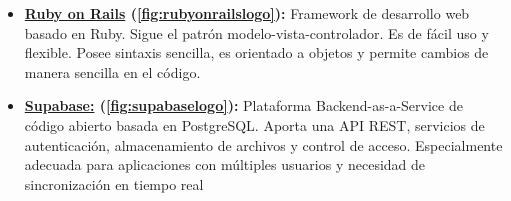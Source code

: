 \begin{itemize}
    \item \textbf{\href{https://rubyonrails.org/}{Ruby on Rails} \cite{rubyonrails2026home} (\ref{fig:rubyonrailslogo}):} Framework de desarrollo web basado en Ruby. Sigue el patrón modelo-vista-controlador. Es de fácil uso y flexible. Posee sintaxis sencilla, es orientado a objetos y permite cambios de manera sencilla en el código.

    \item \textbf{\href{https://supabase.com/}{Supabase:} \cite{supabase2026home} (\ref{fig:supabaselogo}):} Plataforma Backend-as-a-Service de código abierto basada en PostgreSQL. Aporta una API REST, servicios de autenticación, almacenamiento de archivos y control de acceso. Especialmente adecuada para aplicaciones con múltiples usuarios y necesidad de sincronización en tiempo real

\end{itemize}


